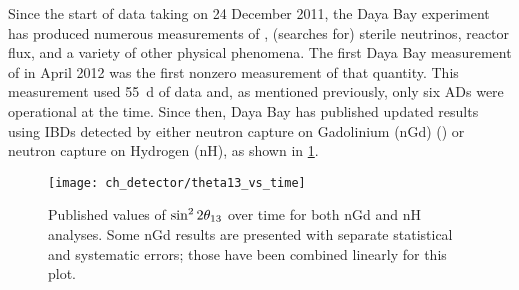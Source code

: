 Since the start of data taking on 24 December 2011,
the Daya Bay experiment has produced numerous measurements of
\thetaot{}, (searches for) sterile neutrinos, reactor \nuebar{} flux,
and a variety of other physical phenomena.
The first Daya Bay measurement of \thetaot{} in April 2012
was the first nonzero measurement of that quantity.
This measurement used \SI{55}{\day} of \nuebar{} data
and, as mentioned previously, only six ADs were operational at the time.
Since then, Daya Bay has published updated results using IBDs detected by
either neutron capture on Gadolinium (nGd)
(\cite{ngd2012,ngd2013,ngd2014,ngd2015,ngd2016,ngd2018}) or neutron capture on Hydrogen (nH),
as shown in \cref{fig:theta13_vs_t}.

\begin{figure}
    \centering
    \texttt{[image: ch\_detector/theta13\_vs\_time]}
    \caption{
        Published values of $\sin^{2}2\theta_{13}$ over time
        for both nGd and nH analyses.
        Some nGd results are presented with separate statistical
        and systematic errors;
        those have been combined linearly for this plot.
    }
    \label{fig:theta13_vs_t}
\end{figure}

